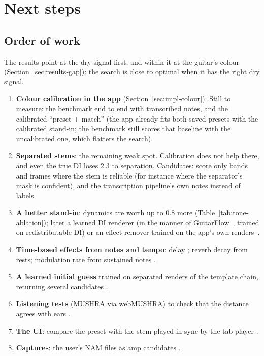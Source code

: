 \section{Next steps}
\label{sec:next}

\subsection{Order of work}

The results point at the dry signal first, and within it at the guitar's colour
(Section~\ref{sec:results-gap}): the search is close to optimal when it has the
right dry signal.

\begin{nextsteps}
\begin{enumerate}
\item \textbf{Colour calibration in the app} \done{} (Section~\ref{sec:impl-colour}).
  Still to measure: the benchmark end to end with transcribed notes, and the
  calibrated ``preset + match'' (the app already fits both saved presets with
  the calibrated stand-in; the benchmark still scores that baseline with the
  uncalibrated one, which flatters the search).
\item \textbf{Separated stems}: the remaining weak spot. Calibration does not
  help there, and even the true DI loses 2.3\dB{} to separation. Candidates:
  score only bands and frames where the stem is reliable (for instance where
  the separator's mask is confident), and the transcription pipeline's own
  notes instead of labels.
\item \textbf{A better stand-in}: dynamics are worth up to 0.8\dB{} more
  (Table~\ref{tab:tone-ablation}); later a learned DI renderer (in the manner of
  GuitarFlow~\cite{loth2025guitarflow}, trained on redistributable DI) or an
  effect remover trained on the app's own renders~\cite{lee2024distortion,yeh2026egvae}.
\item \textbf{Time-based effects from notes and tempo}: delay \done; reverb
  decay from rests; modulation rate from sustained notes \planned.
\item \textbf{A learned initial guess} trained on separated renders of the
  template chain, returning several candidates \planned.
\item \textbf{Listening tests} (MUSHRA via webMUSHRA) to check that the distance
  agrees with ears \planned.
\item \textbf{The UI}: compare the preset with the stem played in sync by the
  tab player \planned.
\item \textbf{Captures}: the user's NAM files as amp candidates \planned.
\end{enumerate}
\end{nextsteps}

